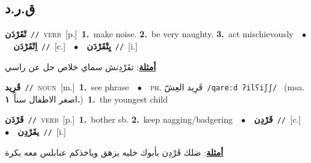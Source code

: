\documentclass[10pt,a4paper,twoside]{article} %
\begin{document}
\begin{multicols}{2}
\vspace{-3mm}
\subsection*{\color{blue}\foreignlanguage{arabic}{ق.ر.د}\color{blue}{}} 

{\setlength\topsep{0pt}\textbf{\foreignlanguage{arabic}{تْقَرْدَن}}\ {\color{gray}\texttt{//}\color{black}}\ \textsc{verb}\ [p.]\ \textbf{1.}~make noise.  \textbf{2.}~be very naughty.  \textbf{3.}~act mischievously\ \ $\bullet$\ \ \setlength\topsep{0pt}\textbf{\foreignlanguage{arabic}{اِتْقَرْدَن}}\ {\color{gray}\texttt{//}\color{black}}\ [c.]\ \ $\bullet$\ \ \setlength\topsep{0pt}\textbf{\foreignlanguage{arabic}{يِتْقَرْدَن}}\ {\color{gray}\texttt{//}\color{black}}\ [i.]\  \begin{flushright}\color{gray}\foreignlanguage{arabic}{\textbf{\underline{\foreignlanguage{arabic}{أمثلة}}}: تقَرْدِنش سماي خلاص حل عن راسي}\end{flushright}\color{black}} \vspace{2mm}

{\setlength\topsep{0pt}\textbf{\foreignlanguage{arabic}{قَرِيد}}\ {\color{gray}\texttt{//}\color{black}}\ \textsc{noun}\ [m.]\ \textbf{1.}~see phrase\ \ $\bullet$\ \ \textsc{ph.} \color{gray} \foreignlanguage{arabic}{قَرِيد العِشّ}\color{black}\ {\color{gray}\texttt{/{\sffamily qareːd ʔilʕiʃʃ}/}\color{black}}\ \color{gray} (msa. \foreignlanguage{arabic}{اصغر الاطفال سناً}~\foreignlanguage{arabic}{\textbf{١.}})\color{black}\ \textbf{1.}~the youngest child\ } \vspace{2mm}

{\setlength\topsep{0pt}\textbf{\foreignlanguage{arabic}{قَرْدَن}}\ {\color{gray}\texttt{//}\color{black}}\ \textsc{verb}\ [p.]\ \textbf{1.}~bother sb.  \textbf{2.}~keep nagging/badgering\ \ $\bullet$\ \ \setlength\topsep{0pt}\textbf{\foreignlanguage{arabic}{قَرْدِن}}\ {\color{gray}\texttt{//}\color{black}}\ [c.]\ \ $\bullet$\ \ \setlength\topsep{0pt}\textbf{\foreignlanguage{arabic}{يقَرْدِن}}\ {\color{gray}\texttt{//}\color{black}}\ [i.]\  \begin{flushright}\color{gray}\foreignlanguage{arabic}{\textbf{\underline{\foreignlanguage{arabic}{أمثلة}}}: ضلك قَرْدِن بأبوك خليه يزهق وياخذكم عنابلس معه بكرة}\end{flushright}\color{black}} \vspace{2mm}


\end{multicols}
\end{document}
